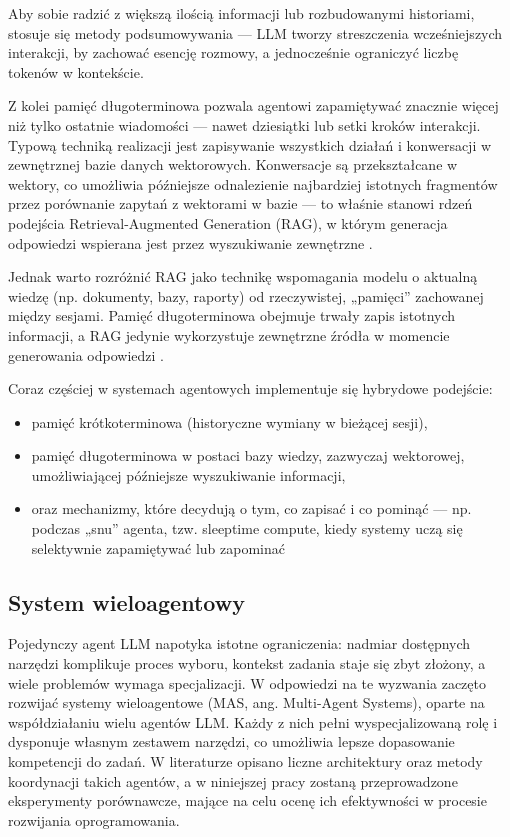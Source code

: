 Aby sobie radzić z większą ilością informacji lub rozbudowanymi historiami, stosuje się metody podsumowywania — LLM tworzy streszczenia wcześniejszych interakcji, by zachować esencję rozmowy, a jednocześnie ograniczyć liczbę tokenów w kontekście.

Z kolei pamięć długoterminowa pozwala agentowi zapamiętywać znacznie więcej niż tylko ostatnie wiadomości — nawet dziesiątki lub setki kroków interakcji. Typową techniką realizacji jest zapisywanie wszystkich działań i konwersacji w zewnętrznej bazie danych wektorowych. Konwersacje są przekształcane w wektory, co umożliwia późniejsze odnalezienie najbardziej istotnych fragmentów przez porównanie zapytań z wektorami w bazie — to właśnie stanowi rdzeń podejścia Retrieval-Augmented Generation (RAG), w którym generacja odpowiedzi wspierana jest przez wyszukiwanie zewnętrzne \cite{medium2023rag, wikipedia2024rag}.

Jednak warto rozróżnić RAG jako technikę wspomagania modelu o aktualną wiedzę (np. dokumenty, bazy, raporty) od rzeczywistej, „pamięci” zachowanej między sesjami. Pamięć długoterminowa obejmuje trwały zapis istotnych informacji, a RAG jedynie wykorzystuje zewnętrzne źródła w momencie generowania odpowiedzi \cite{labelstudio2024memory, letta2024memory}.

Coraz częściej w systemach agentowych implementuje się hybrydowe podejście:
\begin{itemize}
\item pamięć krótkoterminowa (historyczne wymiany w bieżącej sesji),
\item pamięć długoterminowa w postaci bazy wiedzy, zazwyczaj wektorowej, umożliwiającej późniejsze wyszukiwanie informacji,
\item oraz mechanizmy, które decydują o tym, co zapisać i co pominąć — np. podczas „snu” agenta, tzw. sleeptime compute, kiedy systemy uczą się selektywnie zapamiętywać lub zapominać \cite{wired2024sleeptime}
\end{itemize}

\subsection{System wieloagentowy}
Pojedynczy agent LLM napotyka istotne ograniczenia: nadmiar dostępnych narzędzi komplikuje proces wyboru, kontekst zadania staje się zbyt złożony, a wiele problemów wymaga specjalizacji. W odpowiedzi na te wyzwania zaczęto rozwijać systemy wieloagentowe (MAS, ang. Multi-Agent Systems), oparte na współdziałaniu wielu agentów LLM. Każdy z nich pełni wyspecjalizowaną rolę i dysponuje własnym zestawem narzędzi, co umożliwia lepsze dopasowanie kompetencji do zadań. W literaturze opisano liczne architektury oraz metody koordynacji takich agentów, a w niniejszej pracy zostaną przeprowadzone eksperymenty porównawcze, mające na celu ocenę ich efektywności w procesie rozwijania oprogramowania.

